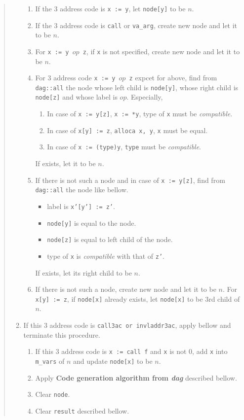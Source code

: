 \begin{quote}
\begin{enumerate}
\begin{enumerate}
\item If the 3 address code is {\tt{x := y}},
      let {\tt{node[y]}} to be $n$.
\item If the 3 address code is {\tt{call}} or {\tt{va\_arg}},
      create new node and let it to be $n$.
\item For {\tt{x := y $op$ z}}, if {\tt{x}} is not specified,
      create new node and let it to be $n$.
\item For 3 address code {\tt{x := y $op$ z}} expcet for above,
      find from {\tt{dag::all}} the node 
      whose left child is {\tt{node[y]}},
      whose right child is {\tt{node[z]}}
      and
      whose label is $op$. Especially,
\begin{enumerate}
\item In case of {\tt{x := y[z]}}, {\tt{x := *y}},
      type of {\tt{x}} must be {\it
      compatible}.
\item In case of {\tt{x[y] := z}}, {\tt{alloca x, y}},
      {\tt{x}} must be equal.
\item In case of {\tt{x := (type)y}}, {\tt{type}} must be
     {\it compatible}.
\end{enumerate}
      If exists, let it to be $n$.
\item \label{optimize_e109}
      If there is not such a node and in case of {\tt{x := y[z]}},
      find from {\tt{dag::all}} the node like bellow.
      \begin{itemize}
      \item label is {\tt{x'[y'] := z'}}.
      \item {\tt{node[y]}} is equal to the node.
      \item {\tt{node[z]}} is equal to left child of the node.
      \item type of {\tt{x}} is {\it compatible} with that of {\tt{z'}}.
      \end{itemize}
      If exists, let its right child to be $n$.
\item \label{optimize_e064}
If there is not such a node, create new node and let it to be $n$.
For {\tt{x[y] := z}}, if {\tt{node[x]}} already exists, let {\tt{node[x]}}
to be 3rd child of $n$.
\end{enumerate}
\item \label{optimize_e112}
      If this 3 address code is {\tt{call3ac} or {\tt{invladdr3ac}}},
      apply bellow and terminate this procedure.
      \begin{enumerate}
      \item If this 3 address code is {\tt{x := call f}} and {\tt{x}} 
            is not 0, add {\tt{x}} into {\tt{m\_vars}} of $n$ and
            update {\tt{node[x]}} to be $n$. 
      \item Apply {\bf Code generation algorithm from {\em dag}}
	    described bellow.
      \item Clear {\tt{node}}.
      \item Clear {\tt{result}} described bellow.
      \end{enumerate}


\end{enumerate}
\end{quote}
